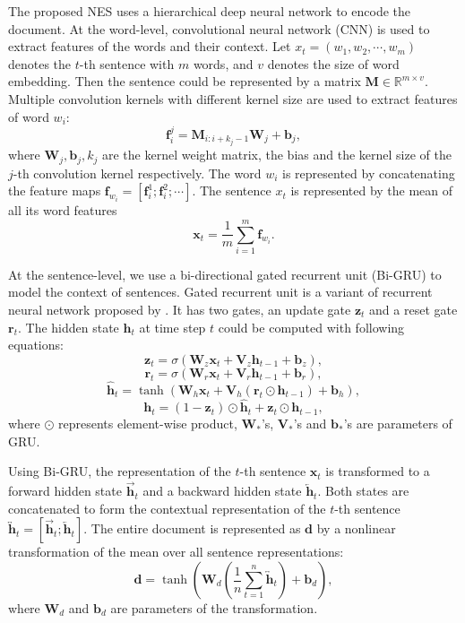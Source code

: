 \documentclass[letterpaper]{article} \usepackage{aaai18}  \usepackage{times}  \usepackage{helvet}  \usepackage{courier}  \usepackage{url}  \usepackage{graphicx}  \usepackage{amssymb}
\begin{document}
	The proposed NES uses a hierarchical deep neural network to encode the document. At the word-level, convolutional neural network (CNN) is used to extract features of the words and their context. Let $x_t=(w_1, w_2, \cdots, w_m)$ denotes the $t$-th sentence with $m$ words, and $v$ denotes the size of word embedding. Then the sentence could be represented by a matrix $\mathbf{M} \in \mathbb{R}^{m \times v}$. Multiple convolution kernels with different kernel size are used to extract features of word $w_i$:
	$$\mathbf{f}_i^j = \mathbf{M}_{i:i+k_j-1} \mathbf{W}_j + \mathbf{b}_j ,$$
	where $\mathbf{W}_j, \mathbf{b}_j, k_j$ are the kernel weight matrix, the bias and the kernel size of the $j$-th convolution kernel respectively. The word $w_i$ is represented by concatenating the feature maps $\mathbf{f}_{w_i}=[\mathbf{f}_i^1 ; \mathbf{f}_i^2 ; \cdots]$. The sentence $x_t$ is represented by the mean of all its word features
	$$ \mathbf{x}_t = \frac{1}{m} \sum_{i=1}^m \mathbf{f}_{w_i} .$$
	
	At the sentence-level, we use a bi-directional gated recurrent unit (Bi-GRU) to model the context of sentences. Gated recurrent unit is a variant of recurrent neural network proposed by \cite{chung2014empirical}. It has two gates, an update gate $\mathbf{z}_t$ and a reset gate $\mathbf{r}_t$. The hidden state $\mathbf{h}_t$ at time step $t$ could be computed with following equations:
	\[ \mathbf{z}_t = \sigma(\mathbf{W}_{z} \mathbf{x}_t + \mathbf{V}_{z} \mathbf{h}_{t-1}  + \mathbf{b}_{z}) , \]
	\[ \mathbf{r}_t = \sigma(\mathbf{W}_{r} \mathbf{x}_t + \mathbf{V}_{r} \mathbf{h}_{t-1}  + \mathbf{b}_{r}) , \]
	\[ \hat{\mathbf{h}}_t = \tanh(\mathbf{W}_{h} \mathbf{x}_t + \mathbf{V}_{h} (\mathbf{r}_{t} \odot \mathbf{h}_{t-1} ) + \mathbf{b}_{h} ) ,\]
	\[ \mathbf{h}_t = (1 - \mathbf{z}_t) \odot \hat{\mathbf{h}}_{t} +  \mathbf{z}_t \odot \mathbf{h}_{t-1} ,\]
	where $\odot$ represents element-wise product, $\mathbf{W}_{*}$'s, $\mathbf{V}_{*}$'s and $\mathbf{b}_{*}$'s are parameters of GRU. 
	
	Using Bi-GRU, the representation of the $t$-th sentence $\mathbf{x}_t$ is transformed to a forward hidden state $\overrightarrow{\mathbf{h}}_t$ and a backward hidden state $\overleftarrow{\mathbf{h}}_t$. Both states are concatenated to form the contextual representation of the $t$-th sentence $\overleftrightarrow{\mathbf{h}}_t = [\overrightarrow{\mathbf{h}}_t ; \overleftarrow{\mathbf{h}}_t]$. The entire document is represented as $\mathbf{d}$ by a nonlinear transformation of the mean over all sentence representations:
	\[ \mathbf{d} = \tanh( \mathbf{W}_d (\frac{1}{n} \sum_{t=1}^{n} \overleftrightarrow{\mathbf{h}}_t ) + \mathbf{b}_d ) ,\]
	where $\mathbf{W}_d$ and $\mathbf{b}_d$ are parameters of the transformation. 
	
\end{document}
